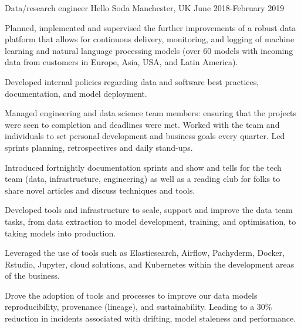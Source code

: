\begin{cventries}
\cventry
{Data/research engineer} %
{Hello Soda } %
{Manchester, UK} %
{June 2018-February 2019 } %
{ %
\begin{cvitems}
\item {Planned, implemented and supervised the further improvements of a robust data platform that allows for continuous delivery, monitoring, and logging of machine learning and natural language processing models (over 60 models with incoming data from customers in Europe, Asia, USA, and Latin America).}
\item{Developed internal policies regarding data and software best practices, documentation, and model deployment. }
\item{Managed engineering and data science team members: ensuring that the projects were seen to completion and deadlines were met. Worked with the team and individuals to set personal development and business goals every quarter. Led sprints planning, retrospectives and daily stand-ups.}
\item{Introduced fortnightly documentation sprints and show and tells for the tech team (data, infrastructure, engineering) as well as a reading club for folks to share novel articles and discuss techniques and tools.} 
\item{Developed tools and infrastructure to scale, support and improve the data team tasks, from data extraction to model development, training, and optimisation, to taking models into production.}
\item{Leveraged the use of tools such as Elasticsearch, Airflow, Pachyderm, Docker, Rstudio, Jupyter, cloud solutions, and Kubernetes within the development areas of the business.}
\item{Drove the adoption of tools and processes to improve our data models reproducibility, provenance (lineage), and sustainability. Leading to a 30\% reduction in incidents associated with drifting, model staleness and performance.}
\end{cvitems}
}



\end{cventries}

